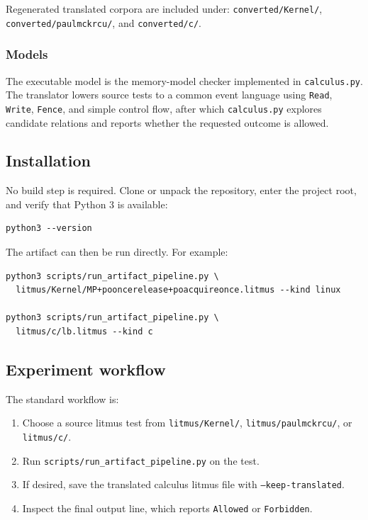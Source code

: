 \documentclass{sigplanconf}
\begin{document}
Regenerated translated corpora are included under:
\texttt{converted/Kernel/}, \texttt{converted/paulmckrcu/}, and
\texttt{converted/c/}.

\subsubsection{Models}

The executable model is the memory-model checker implemented in
\texttt{calculus.py}.  The translator lowers source tests to a common event
language using \texttt{Read}, \texttt{Write}, \texttt{Fence}, and simple
control flow, after which \texttt{calculus.py} explores candidate relations and
reports whether the requested outcome is allowed.

\subsection{Installation}

No build step is required.  Clone or unpack the repository, enter the project
root, and verify that Python 3 is available:

\begin{verbatim}
python3 --version
\end{verbatim}

The artifact can then be run directly.  For example:

\begin{verbatim}
python3 scripts/run_artifact_pipeline.py \
  litmus/Kernel/MP+pooncerelease+poacquireonce.litmus --kind linux

python3 scripts/run_artifact_pipeline.py \
  litmus/c/lb.litmus --kind c
\end{verbatim}

\subsection{Experiment workflow}

The standard workflow is:

\begin{enumerate}
  \item Choose a source litmus test from \texttt{litmus/Kernel/},
        \texttt{litmus/paulmckrcu/}, or \texttt{litmus/c/}. \\
  \item Run \texttt{scripts/run\_artifact\_pipeline.py} on the test. \\
  \item If desired, save the translated calculus litmus file with
        \texttt{--keep-translated}. \\
  \item Inspect the final output line, which reports
        \texttt{Allowed} or \texttt{Forbidden}.
\end{enumerate}
\end{document}
